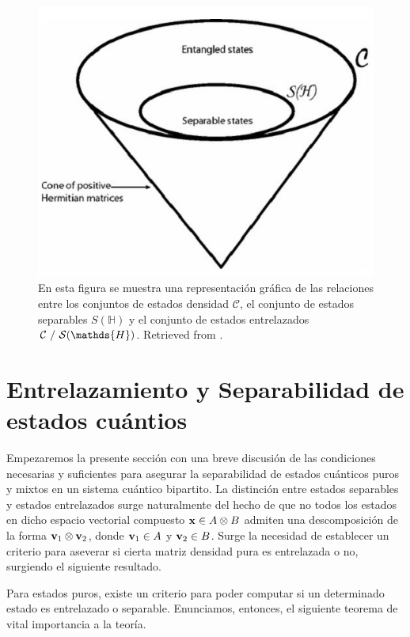 \documentclass{report} %
\numberwithin{equation}{section}
\begin{document}
\begin{figure}
    \centering
    \includegraphics[scale = 0.6]{figs/appendix/QIT sets pictographic img.png}
    \caption{En esta figura se muestra una representación gráfica de las relaciones entre los conjuntos de estados densidad $\mathcal{C}$, el conjunto de estados separables $S(\mathds{H})$ y el conjunto de estados entrelazados $\mathcal{C} \textnormal{ / } \mathcal{S}(\mathds{H})$. Retrieved from \cite{Holik-ECI34}.}
    \label{fig:sets_qit}
\end{figure}

\section{Entrelazamiento y Separabilidad de estados cuántios}

Empezaremos la presente sección con una breve discusión de las condiciones necesarias y suficientes para asegurar la separabilidad de estados cuánticos puros y mixtos en un sistema cuántico bipartito. La distinción entre estados separables y estados entrelazados surge naturalmente del hecho de que no todos los estados en dicho espacio vectorial compuesto ${\bf x} \in A \otimes B$ admiten una descomposición de la forma ${\bf v}_1 \otimes {\bf v}_2$, donde ${\bf v}_1 \in A$ y ${\bf v}_2 \in B$. Surge la necesidad de establecer un criterio para aseverar si cierta matriz densidad pura es entrelazada o no, surgiendo el siguiente resultado. 

Para estados puros, existe un criterio para poder computar si un determinado estado es entrelazado o separable. Enunciamos, entonces, el siguiente teorema de vital importancia a la teoría.
\end{document}
